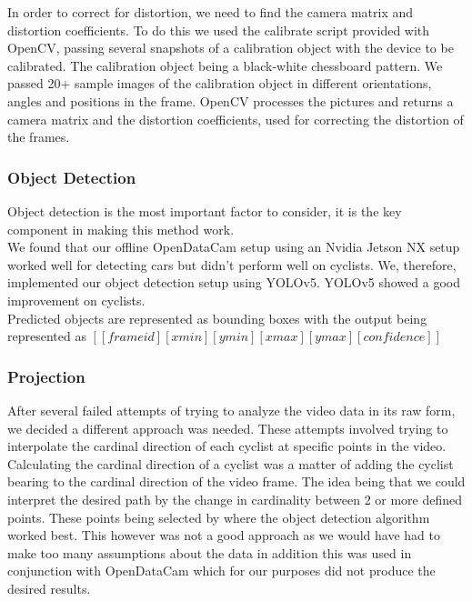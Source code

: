 In order to correct for distortion, we need to find the camera matrix and distortion coefficients. To do this we used the calibrate script provided with OpenCV,
passing several snapshots of a calibration object with the device to be calibrated. The calibration object being a black-white chessboard pattern.
We passed 20+ sample images of the calibration object in different orientations, angles and positions in the frame. OpenCV processes the pictures and
returns a camera matrix and the distortion coefficients, used for correcting the distortion of the frames.
\ \\

\subsubsection{Object Detection}
Object detection is the most important factor to consider, it is the key component in making this method work.
\ \\

We found that our offline OpenDataCam setup using an Nvidia Jetson NX setup worked well for detecting cars but didn't perform well on cyclists. 
We, therefore, implemented our object detection setup using
YOLOv5. YOLOv5 showed a good improvement on cyclists.
\ \\ 
Predicted objects are represented as bounding boxes with the output being represented as $[[frame id][xmin][ymin][xmax][ymax][confidence]]$

\color{red}
\subsubsection{Projection}
After several failed attempts of trying to analyze the video data in its raw form, we decided a different approach was needed.
These attempts involved trying to interpolate the cardinal direction of each cyclist at specific points in the video. Calculating the cardinal direction
of a cyclist was a matter of adding the cyclist bearing to the cardinal direction of the video frame. The idea being that we could interpret
the desired path by the change in cardinality between 2 or more defined points. These points being selected by where the object detection algorithm worked best.
This however was not a good approach as we would have had to make too many assumptions about the data in addition this was used in conjunction
with OpenDataCam which for our purposes did not produce the desired results.
\color{black}
\ \\


